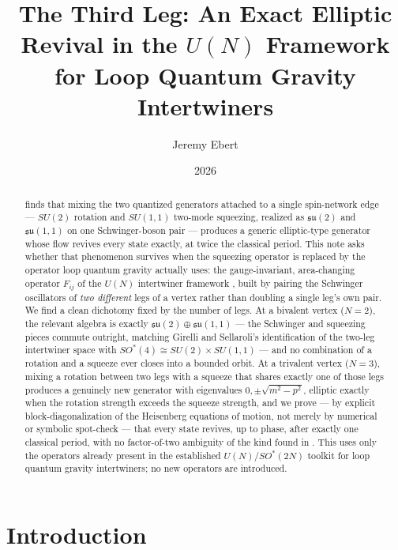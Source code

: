 \documentclass[11pt]{amsart}
\title{The Third Leg: An Exact Elliptic Revival in the $U(N)$ Framework for Loop Quantum Gravity Intertwiners}
\author{Jeremy Ebert}
\date{2026}
\theoremstyle{remark}
\begin{document}
\maketitle

\begin{abstract}
\cite{QuantumRealizations} finds that mixing the two quantized generators attached to a single spin-network edge --- $SU(2)$ rotation and $SU(1,1)$ two-mode squeezing, realized as $\mathfrak{su}(2)$ and $\mathfrak{su}(1,1)$ on one Schwinger-boson pair --- produces a generic elliptic-type generator whose flow revives every state exactly, at twice the classical period. This note asks whether that phenomenon survives when the squeezing operator is replaced by the operator loop quantum gravity actually uses: the gauge-invariant, area-changing operator $F_{ij}$ of the $U(N)$ intertwiner framework \cite{BorjaEtal,FreidelLivine}, built by pairing the Schwinger oscillators of \emph{two different} legs of a vertex rather than doubling a single leg's own pair. We find a clean dichotomy fixed by the number of legs. At a bivalent vertex ($N=2$), the relevant algebra is exactly $\mathfrak{su}(2)\oplus\mathfrak{su}(1,1)$ --- the Schwinger and squeezing pieces commute outright, matching Girelli and Sellaroli's identification of the two-leg intertwiner space with $SO^*(4)\cong SU(2)\times SU(1,1)$ \cite{GirelliSellaroli} --- and no combination of a rotation and a squeeze ever closes into a bounded orbit. At a trivalent vertex ($N=3$), mixing a rotation between two legs with a squeeze that shares exactly one of those legs produces a genuinely new generator with eigenvalues $0,\pm\sqrt{m^2-p^2}$, elliptic exactly when the rotation strength exceeds the squeeze strength, and we prove --- by explicit block-diagonalization of the Heisenberg equations of motion, not merely by numerical or symbolic spot-check --- that every state revives, up to phase, after exactly one classical period, with no factor-of-two ambiguity of the kind found in \cite{QuantumRealizations}. This uses only the operators already present in the established $U(N)/SO^*(2N)$ toolkit for loop quantum gravity intertwiners; no new operators are introduced.
\end{abstract}

\section{Introduction}
\end{document}
